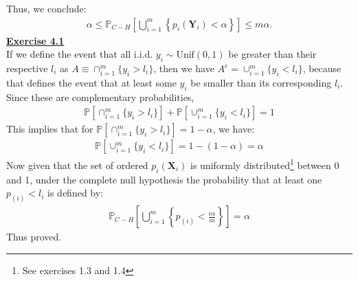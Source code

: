 \documentclass[a4paper, 11pt]{article}
\begin{document}
Thus, we conclude:
\begin{eqnarray}
\alpha \leq \mathbb{P}_{C-H} \left[ \bigcup_{i=1}^{m} \left\{ p_i(\mathbf{Y}_i) < \alpha \right\} \right] \leq m \alpha. \nonumber
\end{eqnarray}
\newpage
\textbf{\underline{Exercise 4.1}}\\
\newline If we define the event that all i.i.d. $y_i \sim\text{Unif}(0, 1)$ be greater than their respective $l_i$ as $A \equiv \cap_{i=1}^{m} \{y_i > l_i \}$, then we have $A^{c} = \cup_{i=1}^{m} \{y_i < l_i \}$, because that defines the event that at least some $y_i$ be smaller than its corresponding $l_i$. Since these are complementary probabilities,
\begin{eqnarray}
\mathbb{P} [ \cap_{i=1}^{m} \{y_i > l_i \} ] + \mathbb{P} [ \cup_{i=1}^{m} \{y_i < l_i \} ]  = 1\nonumber
\end{eqnarray}
This implies that for $\mathbb{P} [ \cap_{i=1}^{m} \{y_i > l_i \} ] = 1-\alpha$, we have:
\begin{eqnarray}
\mathbb{P} [ \cup_{i=1}^{m} \{y_i < l_i \} ] = 1 - (1-\alpha) = \alpha \nonumber
\end{eqnarray}
Now given that the set of ordered $p_i (\mathbf{X}_i)$ is uniformly distributed\footnote{See exercises 1.3 and 1.4} between 0 and 1, under the complete null hypothesis the probability that at least one $p_{(i)} < l_i$ is defined by:
\begin{eqnarray}
\mathbb{P}_{C-H} \left[ \bigcup_{i=1}^{m} \left\{p_{(i)} < \frac{i \alpha}{m} \right\} \right] = \alpha \nonumber
\end{eqnarray}
Thus proved.
\end{document}
